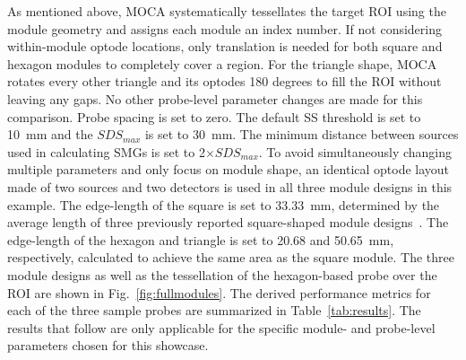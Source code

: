 As mentioned above, MOCA systematically tessellates the target ROI using the module geometry and assigns each module an index number. If not considering within-module optode locations, only translation is needed for both square and hexagon modules to completely cover a region. For the triangle shape, MOCA rotates every other triangle and its optodes 180 degrees to fill the ROI without leaving any gaps. No other probe-level parameter changes are made for this comparison. Probe spacing is set to zero. The default SS threshold is set to 10~mm and the $SDS_{max}$ is set to 30~mm. The minimum distance between sources used in calculating SMGs is set to 2$\times SDS_{max}$. To avoid simultaneously changing multiple parameters and only focus on module shape, an identical optode layout made of two sources and two detectors is used in all three module designs in this example. The edge-length of the square is set to 33.33~mm, determined by the average length of three previously reported square-shaped module designs~\cite{Chitnis2016, Bci2017, Zimmermann2013}. The edge-length of the hexagon and triangle is set to 20.68 and 50.65~mm, respectively, calculated to achieve the same area as the square module. The three module designs as well as the tessellation of the hexagon-based probe over the ROI are shown in Fig.~\ref{fig:fullmodules}. The derived performance metrics for each of the three sample probes are summarized in Table~\ref{tab:results}. The results that follow are only applicable for the specific module- and probe-level parameters chosen for this showcase.

